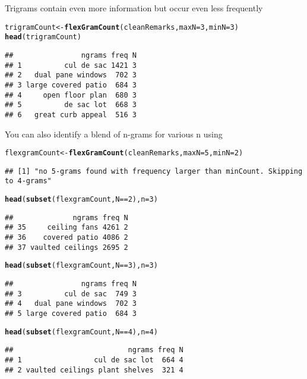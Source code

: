 \documentclass{article}\usepackage[]{graphicx}\usepackage[]{color}
\makeatletter
\newcommand{\hlnum}[1]{\textcolor[rgb]{0.686,0.059,0.569}{#1}}%
\newcommand{\hlopt}[1]{\textcolor[rgb]{0,0,0}{#1}}%
\newcommand{\hlstd}[1]{\textcolor[rgb]{0.345,0.345,0.345}{#1}}%
\newcommand{\hlkwb}[1]{\textcolor[rgb]{0.69,0.353,0.396}{#1}}%
\newcommand{\hlkwc}[1]{\textcolor[rgb]{0.333,0.667,0.333}{#1}}%
\newcommand{\hlkwd}[1]{\textcolor[rgb]{0.737,0.353,0.396}{\textbf{#1}}}%
\newenvironment{kframe}{%
 \def\at@end@of@kframe{}%
 \ifinner\ifhmode%
  \def\at@end@of@kframe{\end{minipage}}%
  \begin{minipage}{\columnwidth}%
 \fi\fi%
 \def\FrameCommand##1{\hskip\@totalleftmargin \hskip-\fboxsep
 \colorbox{shadecolor}{##1}\hskip-\fboxsep
     \hskip-\linewidth \hskip-\@totalleftmargin \hskip\columnwidth}%
 \MakeFramed {\advance\hsize-\width
   \@totalleftmargin\z@ \linewidth\hsize
   \@setminipage}}%
 {\par\unskip\endMakeFramed%
 \at@end@of@kframe}
\newenvironment{knitrout}{}{} %
\makeatother
\begin{document}
\noindent Trigrams contain even more information but occur even less frequently
\begin{knitrout}\footnotesize
{}\color{fgcolor}\begin{kframe}
\begin{alltt}
\hlstd{trigramCount} \hlkwb{<-} \hlkwd{flexGramCount}\hlstd{(cleanRemarks ,} \hlkwc{maxN}\hlstd{=}\hlnum{3} \hlstd{,} \hlkwc{minN}\hlstd{=}\hlnum{3}\hlstd{)}
\hlkwd{head}\hlstd{(trigramCount)}
\end{alltt}
\begin{verbatim}
##                ngrams freq N
## 1          cul de sac 1421 3
## 2   dual pane windows  702 3
## 3 large covered patio  684 3
## 4     open floor plan  680 3
## 5          de sac lot  668 3
## 6   great curb appeal  516 3
\end{verbatim}
\end{kframe}
\end{knitrout}

You can also identify a blend of n-grams for various n using
\begin{knitrout}\footnotesize
{}\color{fgcolor}\begin{kframe}
\begin{alltt}
\hlstd{flexgramCount} \hlkwb{<-} \hlkwd{flexGramCount}\hlstd{(cleanRemarks ,} \hlkwc{maxN}\hlstd{=}\hlnum{5} \hlstd{,} \hlkwc{minN}\hlstd{=}\hlnum{2}\hlstd{)}
\end{alltt}
\begin{verbatim}
## [1] "no 5-grams found with frequency larger than minCount. Skipping to 4-grams"
\end{verbatim}
\begin{alltt}
\hlkwd{head}\hlstd{(}\hlkwd{subset}\hlstd{(flexgramCount , N}\hlopt{==}\hlnum{2}\hlstd{) ,} \hlkwc{n}\hlstd{=}\hlnum{3}\hlstd{)}
\end{alltt}
\begin{verbatim}
##              ngrams freq N
## 35     ceiling fans 4261 2
## 36    covered patio 4086 2
## 37 vaulted ceilings 2695 2
\end{verbatim}
\begin{alltt}
\hlkwd{head}\hlstd{(}\hlkwd{subset}\hlstd{(flexgramCount , N}\hlopt{==}\hlnum{3}\hlstd{) ,} \hlkwc{n}\hlstd{=}\hlnum{3}\hlstd{)}
\end{alltt}
\begin{verbatim}
##                ngrams freq N
## 3          cul de sac  749 3
## 4   dual pane windows  702 3
## 5 large covered patio  684 3
\end{verbatim}
\begin{alltt}
\hlkwd{head}\hlstd{(}\hlkwd{subset}\hlstd{(flexgramCount , N}\hlopt{==}\hlnum{4}\hlstd{) ,} \hlkwc{n}\hlstd{=}\hlnum{4}\hlstd{)}
\end{alltt}
\begin{verbatim}
##                           ngrams freq N
## 1                 cul de sac lot  664 4
## 2 vaulted ceilings plant shelves  321 4
\end{verbatim}
\end{kframe}
\end{knitrout}
\end{document}
